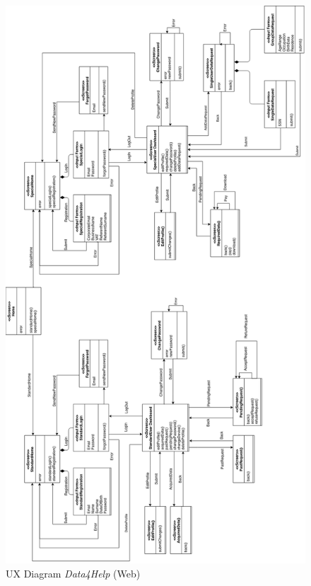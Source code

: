 \begin{figure}[H]
  \begin{center}
  	\includegraphics[height=0.68\paperheight]{./img/UXDiagram/UX_Diagram_Data4Help.png}
    \hspace{0.05\linewidth}
    \centering
    \caption{UX Diagram \textit{Data4Help} (Web)}
		\label{img:Data4Help}
    \end{center}
\end{figure}

